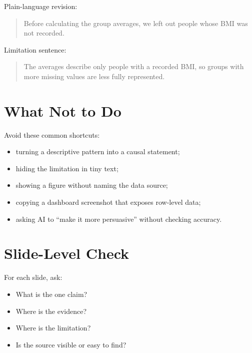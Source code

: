 \documentclass[
  letterpaper,
  DIV=11,
  numbers=noendperiod,
  oneside]{scrreprt}
\providecommand{\tightlist}{%
  \setlength{\itemsep}{0pt}\setlength{\parskip}{0pt}}
\begin{document}
Plain-language revision:

\begin{quote}
Before calculating the group averages, we left out people whose BMI was
not recorded.
\end{quote}

Limitation sentence:

\begin{quote}
The averages describe only people with a recorded BMI, so groups with
more missing values are less fully represented.
\end{quote}

\section*{What Not to Do}\label{what-not-to-do}


Avoid these common shortcuts:

\begin{itemize}
\tightlist
\item
  turning a descriptive pattern into a causal statement;
\item
  hiding the limitation in tiny text;
\item
  showing a figure without naming the data source;
\item
  copying a dashboard screenshot that exposes row-level data;
\item
  asking AI to ``make it more persuasive'' without checking accuracy.
\end{itemize}

\section*{Slide-Level Check}\label{slide-level-check}


For each slide, ask:

\begin{itemize}
\tightlist
\item
  What is the one claim?
\item
  Where is the evidence?
\item
  Where is the limitation?
\item
  Is the source visible or easy to find?
\end{itemize}
\end{document}

